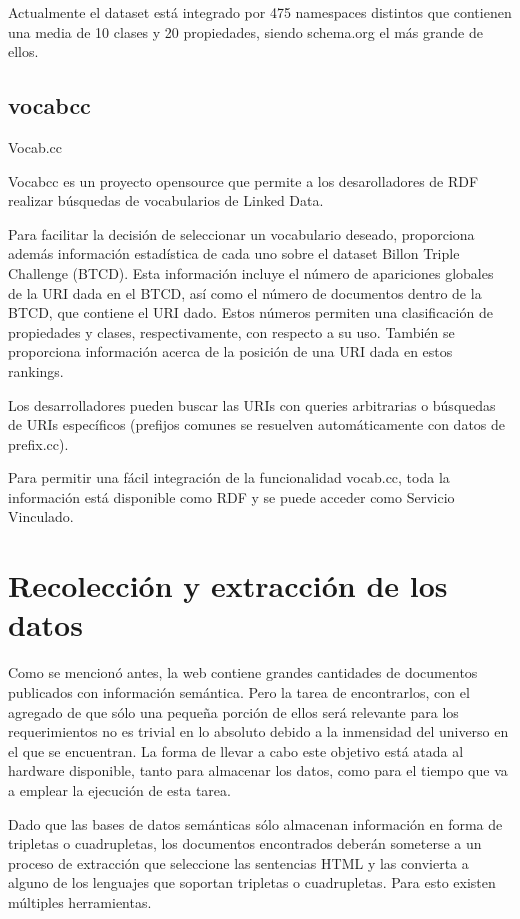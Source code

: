 Actualmente el dataset está integrado por 475 namespaces distintos que contienen una media de 10 clases y 20 propiedades, siendo schema.org el más grande de ellos.

\subsection{vocabcc}

Vocab.cc

Vocabcc es un proyecto opensource que permite a los desarolladores de RDF realizar búsquedas de vocabularios de Linked Data.

Para facilitar la decisión de seleccionar un vocabulario deseado, proporciona además información estadística de cada uno sobre el dataset Billon Triple Challenge (BTCD). 
 Esta información incluye el número de apariciones globales de la URI dada en el BTCD, así como el número de documentos dentro de la BTCD, que contiene el URI dado. Estos números permiten una clasificación de propiedades y clases, respectivamente, con respecto a su uso. También se proporciona información acerca de la posición de una URI dada en estos rankings.

Los desarrolladores pueden buscar las URIs con queries arbitrarias o búsquedas de URIs específicos (prefijos comunes se resuelven automáticamente con datos de prefix.cc).

Para permitir una fácil integración de la funcionalidad vocab.cc, toda la información está disponible como RDF y se puede acceder como Servicio Vinculado.

\section{Recolección y extracción de los datos}

%
Como se mencionó antes, la web contiene grandes cantidades de documentos publicados con información semántica. Pero la tarea
de encontrarlos, con el agregado de que sólo una pequeña porción de ellos será relevante para los requerimientos no es trivial
en lo absoluto debido a la inmensidad del universo en el que se encuentran. La forma de llevar a cabo este objetivo está 
atada al hardware disponible, tanto para almacenar los datos, como para el tiempo que va a emplear la ejecución de esta 
tarea.  

Dado que las bases de datos semánticas sólo almacenan información en forma de tripletas o cuadrupletas, los documentos encontrados 
deberán someterse a un proceso de extracción que seleccione las sentencias HTML y las convierta a alguno de los lenguajes que soportan  
tripletas o cuadrupletas. Para esto existen múltiples herramientas. 

